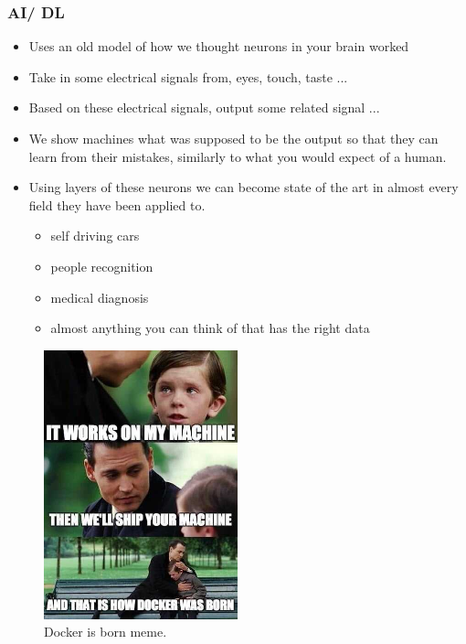 \documentclass[aspectratio=169]{beamer}
\begin{document}
  \begin{frame}
    \frametitle{AI/ DL}
    \begin{itemize}
        \item Uses an old model of how we thought neurons in your brain worked
        \item Take in some electrical signals from, eyes, touch, taste ...
        \item Based on these electrical signals, output some related signal ...
        \item We show machines what was supposed to be the output so that they can learn from their mistakes, similarly to what you would expect of a human.
        \item Using layers of these neurons we can become state of the art in almost every field they have been applied to.
        \begin{itemize}
            \item self driving cars
            \item people recognition
            \item medical diagnosis
            \item almost anything you can think of that has the right data
        \end{itemize}
    \end{itemize}
  \end{frame}

  \begin{frame}
    \begin{figure}[th!]
      \centering
      \includegraphics[width=0.5\textwidth]{docker-is-born-meme.jpg}
      \caption{Docker is born meme.}
      \label{fig:docker_born}
    \end{figure}
  \end{frame}
\end{document}
